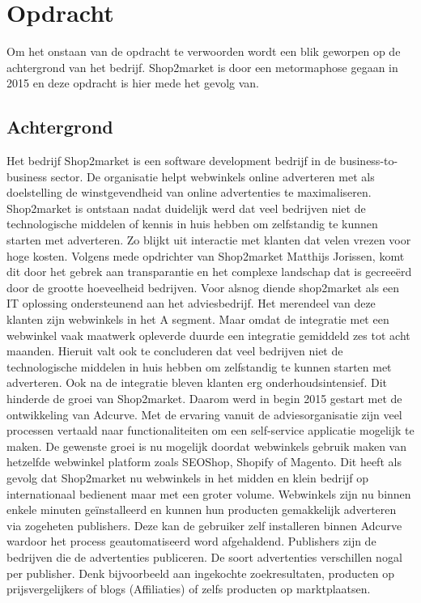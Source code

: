 \chapter{Opdracht}

Om het onstaan van de opdracht te verwoorden wordt een blik geworpen op de achtergrond van het bedrijf. Shop2market is door een metormaphose gegaan in 2015 en deze opdracht is hier mede het gevolg van.

\section{Achtergrond}

Het bedrijf Shop2market is een software development bedrijf in de business-to-business sector. De organisatie helpt webwinkels online adverteren met als doelstelling de winstgevendheid van online advertenties te maximaliseren.
Shop2market is ontstaan nadat duidelijk werd dat veel bedrijven niet de technologische middelen of kennis in huis hebben om zelfstandig te kunnen starten met adverteren. Zo blijkt uit interactie met klanten dat velen vrezen voor hoge kosten. Volgens mede opdrichter van Shop2market Matthijs Jorissen, komt dit door het gebrek aan transparantie en het complexe landschap dat is gecreeërd door de grootte hoeveelheid bedrijven.
Voor alsnog diende shop2market als een IT oplossing ondersteunend aan het adviesbedrijf. Het merendeel van deze klanten zijn webwinkels in het A segment. Maar omdat de integratie met een webwinkel vaak maatwerk opleverde duurde een integratie gemiddeld zes tot acht maanden. Hieruit valt ook te concluderen dat veel bedrijven niet de technologische middelen in huis hebben om zelfstandig te kunnen starten met adverteren. Ook na de integratie bleven klanten erg onderhoudsintensief. Dit hinderde de groei van Shop2market.
Daarom werd in begin 2015 gestart met de ontwikkeling van Adcurve. Met de ervaring vanuit de adviesorganisatie zijn veel processen vertaald naar functionaliteiten om een self-service applicatie mogelijk te maken. De gewenste groei is nu mogelijk doordat webwinkels gebruik maken van hetzelfde webwinkel platform zoals SEOShop, Shopify of Magento.  Dit heeft als gevolg dat Shop2market nu webwinkels in het midden en klein bedrijf op internationaal bedienent maar met een groter volume.
Webwinkels zijn nu binnen enkele minuten geïnstalleerd en kunnen hun producten gemakkelijk adverteren via zogeheten publishers. Deze kan de gebruiker zelf installeren binnen Adcurve wardoor het process geautomatiseerd word afgehaldend. Publishers zijn de bedrijven die de advertenties publiceren. De soort advertenties verschillen nogal per publisher. Denk bijvoorbeeld aan ingekochte zoekresultaten, producten op prijsvergelijkers of blogs (Affiliaties) of zelfs producten op marktplaatsen.
